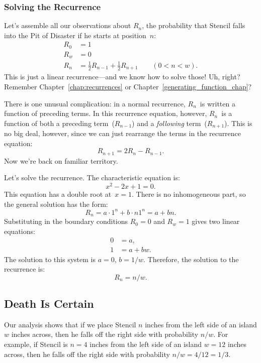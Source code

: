\subsubsection{Solving the Recurrence}

Let's assemble all our observations about $R_n$, the probability that
Stencil falls into the Pit of Disaster if he starts at position~$n$:
%
\[
\begin{array}{rl}
R_0 & = 1 \\
R_w & = 0 \\
R_n & = \frac{1}{2} R_{n-1} + \frac{1}{2} R_{n+1} \qquad (0 < n < w).
\end{array}
\]
%
This is just a linear recurrence---and we know how to solve those!
Uh, right?  Remember Chapter~\ref{chap:recurrences} or
Chapter~\ref{generating_function_chap}?

There is one unusual complication: in a normal recurrence, $R_n$~is
written a function of preceding terms.  In this recurrence equation,
however, $R_n$~is a function of both a preceding term~($R_{n-1}$) and
a \emph{following} term~($R_{n+1}$).  This is no big deal, however,
since we can just rearrange the terms in the recurrence equation:
%
\[
    R_{n+1} = 2 R_n - R_{n-1}.
\]
%
Now we're back on familiar territory.

Let's solve the recurrence.  The characteristic equation is:
%
\[
    x^2 - 2 x + 1 = 0.
\]
%
This equation has a double root at~$x = 1$.  There is no inhomogeneous
part, so the general solution has the form:
%
\[
    R_n = a \cdot 1^n + b \cdot n 1^n = a + b n.
\]
%
Substituting in the boundary conditions $R_0 = 0$ and $R_w = 1$ gives
two linear equations:
%
\begin{align*}
0 & = a, \\
1 & = a + b w.
\end{align*}
%
The solution to this system is $a = 0$, $b = 1 / w$.  Therefore, the
solution to the recurrence is:
%
\[
    R_n = n / w.
\]

\subsection{Death Is Certain}

Our analysis shows that if we place Stencil $n$ inches from the left
side of an island $w$ inches across, then he falls off the right side
with probability $n / w$.  For example, if Stencil is $n = 4$ inches
from the left side of an island $w = 12$ inches across, then he falls
off the right side with probability $n / w = 4 / 12 = 1 / 3$.


